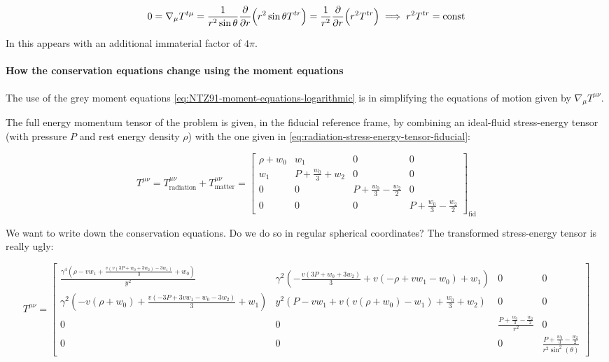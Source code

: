 \documentclass[main.tex]{subfiles}
\begin{document}
\begin{equation}
  0=\nabla_\mu T^{t \mu}
  = \frac{1}{r^2 \sin \theta} \pdv{}{r} \qty(r^2 \sin\theta T^{tr})
  = \frac{1}{r^2} \pdv{}{r} \qty(r^2 T^{tr})
  \implies
  r^2 T^{tr} = \const
\end{equation}

In \cite[before eq. 18c]{ThorneFLammmangZytkow:1981feb} this appears with an additional immaterial factor of \(4 \pi\).

\paragraph{How the conservation equations change using the moment equations}

The use of the grey moment equations \eqref{eq:NTZ91-moment-equations-logarithmic} is in simplifying the equations of motion given by \(\nabla_\mu T^{\mu\nu}\).

The full energy momentum tensor of the problem is given, in the fiducial reference frame, by combining an ideal-fluid stress-energy tensor (with pressure \(P\) and rest energy density \(\rho\)) with the one given in \eqref{eq:radiation-stress-energy-tensor-fiducial}:

\begin{equation}
    T^{\mu\nu} =
    T^{\mu\nu}_{\text{radiation}} +
    T^{\mu\nu}_{\text{matter}} =
    \left[\begin{matrix}\rho + w_{0} & w_{1} & 0 & 0\\w_{1} & P + \frac{w_{0}}{3} + w_{2} & 0 & 0\\0 & 0 & P + \frac{w_{0}}{3} - \frac{w_{2}}{2} & 0\\0 & 0 & 0 & P + \frac{w_{0}}{3} - \frac{w_{2}}{2}\end{matrix}\right] _{\text{fid}}
\end{equation}

\begin{greenbox}
  We want to write down the conservation equations. Do we do so in regular spherical coordinates? The transformed stress-energy tensor is really ugly:

  \begin{equation}
      T ^{\mu\nu} =
      \left[\begin{matrix}\frac{\gamma^{4} \left(\rho - v w_{1} + \frac{v \left(v \left(3 P + w_{0} + 3 w_{2}\right) - 3 w_{1}\right)}{3} + w_{0}\right)}{y^{2}} & \gamma^{2} \left(- \frac{v \left(3 P + w_{0} + 3 w_{2}\right)}{3} + v \left(- \rho + v w_{1} - w_{0}\right) + w_{1}\right) & 0 & 0\\\gamma^{2} \left(- v \left(\rho + w_{0}\right) + \frac{v \left(- 3 P + 3 v w_{1} - w_{0} - 3 w_{2}\right)}{3} + w_{1}\right) & y^{2} \left(P - v w_{1} + v \left(v \left(\rho + w_{0}\right) - w_{1}\right) + \frac{w_{0}}{3} + w_{2}\right) & 0 & 0\\0 & 0 & \frac{P + \frac{w_{0}}{3} - \frac{w_{2}}{2}}{r^{2}} & 0\\0 & 0 & 0 & \frac{P + \frac{w_{0}}{3} - \frac{w_{2}}{2}}{r^{2} \sin^{2}{\left(\theta \right)}}\end{matrix}\right]
  \end{equation}
\end{greenbox}
\end{document}
